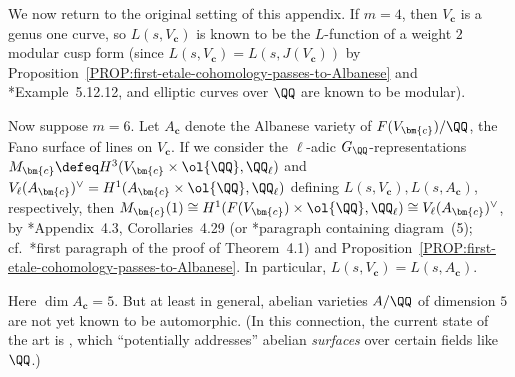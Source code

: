 \documentclass[12pt]{report}
\begin{document}


We now return to the original setting of this appendix.
If $m=4$,
then $V_{\bm{c}}$ is a genus one curve,
so $L(s,V_{\bm{c}})$ is known to be the $L$-function of a weight $2$ modular cusp form
(since $L(s,V_{\bm{c}})=L(s,J(V_{\bm{c}}))$ by Proposition~\ref{PROP:first-etale-cohomology-passes-to-Albanese} and \cite{poonen2017rational}*{Example~5.12.12},
and elliptic curves over $\QQ$ are known to be modular).

Now suppose $m=6$.
Let $A_{\bm{c}}$ denote the Albanese variety of $F(V_{\bm{c}})/\QQ$,
the Fano surface of lines on $V_{\bm{c}}$.
If we consider the $\ell$-adic $G_{\QQ}$-representations
$M_{\bm{c}}\defeq H^3(V_{\bm{c}}\times \ol{\QQ}, \QQ_\ell)$ and $V_\ell(A_{\bm{c}})^\vee = H^1(A_{\bm{c}}\times \ol{\QQ}, \QQ_\ell)$
defining $L(s,V_{\bm{c}}),L(s,A_{\bm{c}})$, respectively,
then $M_{\bm{c}}(1)\cong H^1(F(V_{\bm{c}})\times \ol{\QQ}, \QQ_\ell)\cong V_\ell(A_{\bm{c}})^\vee$, by \cite{reid1972complete}*{Appendix~4.3, Corollaries~4.29} (or \cite{charles2015conjecture}*{paragraph containing diagram~(5)}; cf.~\cite{debarre2021lines}*{first paragraph of the proof of Theorem~4.1}) and Proposition~\ref{PROP:first-etale-cohomology-passes-to-Albanese}.
In particular, $L(s,V_{\bm{c}}) = L(s,A_{\bm{c}})$.

Here $\dim A_{\bm{c}}=5$.
But at least in general,
abelian varieties $A/\QQ$ of dimension $5$ are not yet known to be automorphic.
(In this connection,
the current state of the art is \cite{boxer2021abelian},
which ``potentially addresses'' abelian \emph{surfaces} over certain fields like $\QQ$.)
\end{document}
